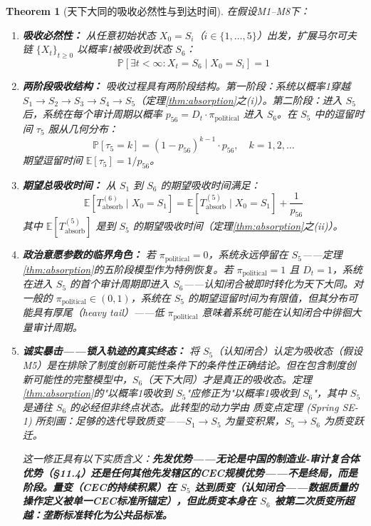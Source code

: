 \documentclass[12pt,a4paper]{ctexart}
\newtheorem{theorem}{Theorem}[section]
\theoremstyle{definition}
\theoremstyle{remark}
\begin{document}
\begin{theorem}[天下大同的吸收必然性与到达时间]
\label{thm:universal-harmony-absorption}
在假设M1--M8下：

\begin{enumerate}[label=(\roman*), itemsep=6pt]
\item \textbf{吸收必然性：} 从任意初始状态 $X_0 = S_i$（$i \in \{1, \ldots, 5\}$）出发，扩展马尔可夫链 $\{X_t\}_{t \geq 0}$ 以概率1被吸收到状态 $S_6$：
\begin{equation}
\mathbb{P}\left[\exists t < \infty : X_t = S_6 \mid X_0 = S_i\right] = 1
\end{equation}

\item \textbf{两阶段吸收结构：} 吸收过程具有两阶段结构。第一阶段：系统以概率1穿越 $S_1 \to S_2 \to S_3 \to S_4 \to S_5$（定理\ref{thm:absorption}之(i)）。第二阶段：进入 $S_5$ 后，系统在每个审计周期以概率 $p_{56} = D_t \cdot \pi_{\text{political}}$ 进入 $S_6$。在 $S_5$ 中的逗留时间 $\tau_5$ 服从几何分布：
\begin{equation}
\mathbb{P}[\tau_5 = k] = (1 - p_{56})^{k-1} \cdot p_{56}, \quad k = 1, 2, \ldots
\end{equation}
期望逗留时间 $\mathbb{E}[\tau_5] = 1 / p_{56}$。

\item \textbf{期望总吸收时间：} 从 $S_1$ 到 $S_6$ 的期望吸收时间满足：
\begin{equation}
\mathbb{E}[T_{\text{absorb}}^{(6)} \mid X_0 = S_1] = \mathbb{E}[T_{\text{absorb}}^{(5)} \mid X_0 = S_1] + \frac{1}{p_{56}}
\end{equation}
其中 $\mathbb{E}[T_{\text{absorb}}^{(5)}]$ 是到 $S_5$ 的期望吸收时间（定理\ref{thm:absorption}之(ii)）。

\item \textbf{政治意愿参数的临界角色：} 若 $\pi_{\text{political}} = 0$，系统永远停留在 $S_5$——定理\ref{thm:absorption}的五阶段模型作为特例恢复。若 $\pi_{\text{political}} = 1$ 且 $D_t = 1$，系统在进入 $S_5$ 的首个审计周期即进入 $S_6$——认知闭合被即时转化为天下大同。对一般的 $\pi_{\text{political}} \in (0, 1)$，系统在 $S_5$ 的期望逗留时间为有限值，但其分布可能具有厚尾（heavy tail）——低 $\pi_{\text{political}}$ 意味着系统可能在认知闭合中徘徊大量审计周期。

\item \textbf{诚实暴击——锁入轨迹的真实终态：} 将 $S_5$（认知闭合）认定为吸收态（假设M5）是\textit{在排除了制度创新可能性条件下的条件性正确}结论。但在包含制度创新可能性的完整模型中，$S_6$（天下大同）才是真正的吸收态。定理\ref{thm:absorption}的"以概率1吸收到 $S_5$"应修正为"以概率1吸收到 $S_6$"，其中 $S_5$ 是通往 $S_6$ 的必经但非终点状态。此转型的动力学由 质变点定理 (Spring SE-1) 所刻画：足够的迭代导致质变——$S_1 \to S_5$ 为量变积累，$S_5 \to S_6$ 为质变跃迁。

这一修正具有以下实质含义：\textbf{先发优势——无论是中国的制造业-审计复合体优势（§11.4）还是任何其他先发辖区的CEC规模优势——不是终局，而是阶段。量变（CEC的持续积累）在 $S_5$ 达到质变（认知闭合——数据质量的操作定义被单一CEC标准所锚定），但此质变本身在 $S_6$ 被第二次质变所超越：垄断标准转化为公共品标准。}
\end{enumerate}
\end{theorem}
\end{document}
